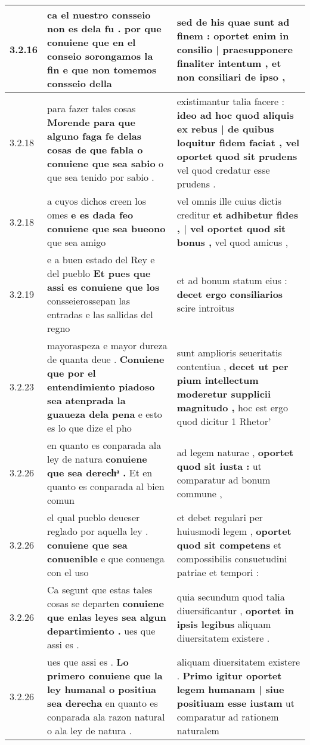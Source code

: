 \begin{tabular}{|p{1cm}|p{6.5cm}|p{6.5cm}|}
3.2.16 & ca el nuestro consseio non es dela fu . \textbf{ por que conuiene que en el conseio sorongamos la fin } e que non tomemos consseio della & sed de his quae sunt ad finem : \textbf{ oportet enim in consilio | praesupponere finaliter intentum , } et non consiliari de ipso , \\\hline
3.2.18 & para fazer tales cosas \textbf{ Morende para que alguno faga fe delas cosas de que fabla o conuiene que sea sabio } o que sea tenido por sabio . & existimantur talia facere : \textbf{ ideo ad hoc quod aliquis ex rebus | de quibus loquitur fidem faciat , vel oportet quod sit prudens } vel quod credatur esse prudens . \\\hline
3.2.18 & a cuyos dichos creen los omes \textbf{ e es dada feo conuiene que sea bueono } que sea amigo & vel omnis ille cuius dictis creditur \textbf{ et adhibetur fides , | vel oportet quod sit bonus , } vel quod amicus , \\\hline
3.2.19 & e a buen estado del Rey e del pueblo \textbf{ Et pues que assi es conuiene que los } consseierossepan las entradas e las sallidas del regno & et ad bonum statum eius : \textbf{ decet ergo consiliarios } scire introitus \\\hline
3.2.23 & mayoraspeza e mayor dureza de quanta deue . \textbf{ Conuiene que por el entendimiento piadoso sea atenprada la guaueza dela pena } e esto es lo que dize el pho & sunt amplioris seueritatis contentiua , \textbf{ decet ut per pium intellectum moderetur supplicii magnitudo , } hoc est ergo quod dicitur 1 Rhetor’ \\\hline
3.2.26 & en quanto es conparada ala ley de natura \textbf{ conuiene que sea derechͣ . } Et en quanto es conparada al bien comun & ad legem naturae , \textbf{ oportet quod sit iusta : } ut comparatur ad bonum commune , \\\hline
3.2.26 & el qual pueblo deueser reglado por aquella ley . \textbf{ conuiene que sea conuenible } e que conuenga con el uso & et debet regulari per huiusmodi legem , \textbf{ oportet quod sit competens } et compossibilis consuetudini patriae et tempori : \\\hline
3.2.26 & Ca segunt que estas tales cosas se departen \textbf{ conuiene que enlas leyes sea algun departimiento . } ues que assi es . & quia secundum quod talia diuersificantur , \textbf{ oportet in ipsis legibus } aliquam diuersitatem existere . \\\hline
3.2.26 & ues que assi es . \textbf{ Lo primero conuiene que la ley humanal o positiua sea derecha } en quanto es conparada ala razon natural o ala ley de natura . & aliquam diuersitatem existere . \textbf{ Primo igitur oportet legem humanam | siue positiuam esse iustam } ut comparatur ad rationem naturalem \\\hline

\end{tabular}
